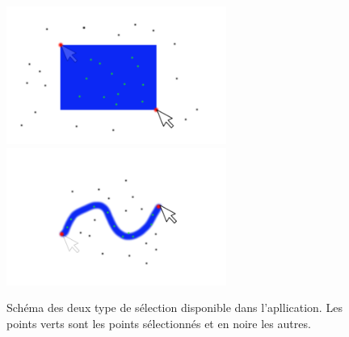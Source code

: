 \begin{figure}[!h]
  \begin{center}
    \includegraphics[height=4.5cm]{image/selection1.png}
    \includegraphics[height=4.5cm]{image/selection2.png}
    \caption{Schéma des deux type de sélection disponible dans l'apllication. Les points verts
    sont les points sélectionnés et en noire les autres.}
  \end{center}
\end{figure}

